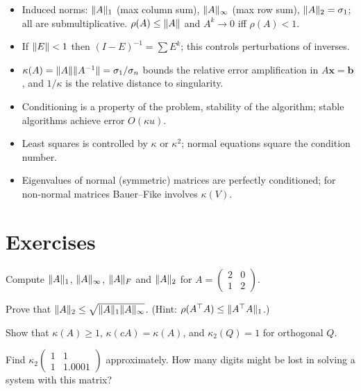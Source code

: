 \begin{summarybox}
\begin{itemize}
  \item Induced norms: $\lVert A\rVert_1$ (max column sum), $\lVert A\rVert_\infty$ (max row sum), $\lVert A\rVert_2=\sigma_1$; all are submultiplicative. $\rho(A)\le\lVert A\rVert$ and $A^k\to0$ iff $\rho(A)<1$.
  \item If $\lVert E\rVert<1$ then $(I-E)^{-1}=\sum E^k$; this controls perturbations of inverses.
  \item $\kappa(A)=\lVert A\rVert\lVert A^{-1}\rVert=\sigma_1/\sigma_n$ bounds the relative error amplification in $A\mathbf{x}=\mathbf{b}$, and $1/\kappa$ is the relative distance to singularity.
  \item Conditioning is a property of the problem, stability of the algorithm; stable algorithms achieve error $O(\kappa u)$.
  \item Least squares is controlled by $\kappa$ or $\kappa^2$; normal equations square the condition number.
  \item Eigenvalues of normal (symmetric) matrices are perfectly conditioned; for non-normal matrices Bauer--Fike involves $\kappa(V)$.
\end{itemize}
\end{summarybox}

\section{Exercises}

\begin{exercise}
Compute $\lVert A\rVert_1$, $\lVert A\rVert_\infty$, $\lVert A\rVert_F$ and $\lVert A\rVert_2$ for $A=\begin{pmatrix}2&0\\1&2\end{pmatrix}$.
\end{exercise}

\begin{exercise}
Prove that $\lVert A\rVert_2\le\sqrt{\lVert A\rVert_1\lVert A\rVert_\infty}$. (Hint: $\rho(A^{\top} A)\le\lVert A^{\top} A\rVert_1$.)
\end{exercise}

\begin{exercise}
Show that $\kappa(A)\ge1$, $\kappa(cA)=\kappa(A)$, and $\kappa_2(Q)=1$ for orthogonal $Q$.
\end{exercise}

\begin{exercise}
Find $\kappa_2\begin{pmatrix}1&1\\1&1.0001\end{pmatrix}$ approximately. How many digits might be lost in solving a system with this matrix?
\end{exercise}

